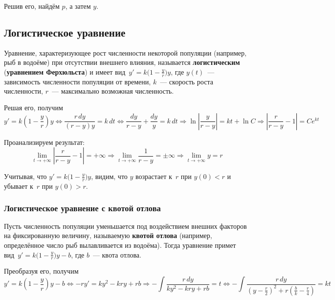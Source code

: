 Решив его, найдём $p$, а затем $y$.

\subsection{Логистическое уравнение}
  Уравнение, характеризующее рост численности некоторой популяции (например, рыб в водоёме) при отсутствии внешнего влияния, называется \textbf{логистическим} (\textbf{уравнением Ферхюльста}) и имеет вид~$y' = k \bigl( 1 - \frac{y}r \bigr) y$, где $y(t)$~--- зависимость численности популяции от времени, $k$~--- скорость роста численности, $r$~--- максимально возможная численность.

Решая его, получим
\begin{equation*}
y' = k \left(1 - \frac{y}r\right) y \Leftrightarrow
\frac{r\,dy}{(r - y)y} = k\,dt \Leftrightarrow
\frac{dy}{r - y} + \frac{dy}y = k\,dt \Rightarrow
\ln \left| \frac{y}{r - y} \right| = kt + \ln C \Rightarrow
\left| \frac{r}{r - y} - 1 \right| = C e^{kt}
\end{equation*}

Проанализируем результат:
\begin{equation*}
\lim_{t \to +\infty} \left| \frac{r}{r - y} - 1 \right| = +\infty \Rightarrow
\lim_{t \to +\infty} \frac1{r - y} = \pm\infty \Rightarrow
\lim_{t \to +\infty} y = r
\end{equation*}

Учитывая, что $y' = k \bigl( 1 - \frac{y}r \bigr) y$, видим, что $y$ возрастает к~$r$ при $y(0) < r$ и убывает к~$r$ при $y(0) > r$.

\subsubsection{Логистическое уравнение с квотой отлова}
Пусть численность популяции уменьшается под воздействием внешних факторов на фиксированную величину, называемую \textbf{квотой отлова} (например, определённое число рыб вылавливается из водоёма).
Тогда уравнение примет вид~$y' = k \bigl( 1 - \frac{y}r \bigr) y - b$, где $b$~--- квота отлова.

Преобразуя его, получим
\begin{equation*}
y' = k \left( 1 - \frac{y}r \right) y - b \Leftrightarrow
-ry' = ky^2 - kry + rb \Rightarrow
-\int \frac{r\,dy}{ky^2 - kry + rb} = t \Leftrightarrow
-\int \frac{r\,dy}{\left( y - \frac{r}2 \right)^2 + r\left( \frac{b}k - \frac{r}4 \right)} = kt
\end{equation*}

